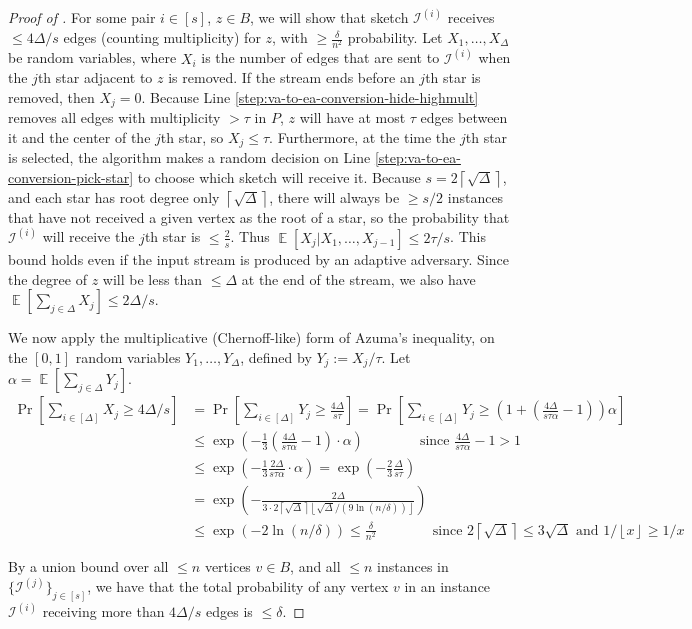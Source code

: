 \documentclass[10pt]{article}
\theoremstyle{definition}\newtheorem{definition}[lemma]{Definition}
\theoremstyle{remark}  \newtheorem*{remark}{Remark}
\DeclareMathOperator{\EE}{\mathbb{E}}
\newcommand{\cI}{\mathcal{I}}
\newcommand{\ceil}[1]{{\left\lceil{#1}\right\rceil}}
\newcommand{\floor}[1]{{\left\lfloor{#1}\right\rfloor}}
\begin{document}
\begin{proof}[Proof of ]
  For some pair $i \in [s]$, $z \in B$, we will show that sketch $\cI^{(i)}$ receives $\le 4 \Delta / s$ edges (counting multiplicity) for $z$, with $\ge \frac{\delta}{n^2}$ probability. Let $X_1,\ldots,X_\Delta$ be random variables, where $X_i$ is the number of edges that are sent to $\cI^{(i)}$ when the $j$th star adjacent to $z$ is removed. If the stream ends before an $j$th star is removed, then $X_j = 0$. Because Line \ref{step:va-to-ea-conversion-hide-highmult} removes all edges with multiplicity $> \tau$ in $P$, $z$ will have at most $\tau$ edges between it and the center of the $j$th star, so $X_j \le \tau$. Furthermore, at the time the $j$th star is selected, the algorithm makes a random decision on Line \ref{step:va-to-ea-conversion-pick-star} to choose which sketch will receive it. Because $s = 2\ceil{\sqrt{\Delta}}$, and each star has root degree only $\ceil{\sqrt{\Delta}}$, there will always be $\ge s/2$ instances that have not received a given vertex as the root of a star, so the probability that $\cI^{(i)}$ will receive the $j$th star is $\le \frac{2}{s}$. Thus $\EE[X_j | X_1,\ldots,X_{j-1}] \le 2 \tau / s$. This bound holds even if the input stream is produced by an adaptive adversary. Since the degree of $z$ will be less than $\le \Delta$ at the end of the stream, we also have $\EE[\sum_{j \in \Delta} X_j] \le 2 \Delta / s$.
  
  We now apply the multiplicative (Chernoff-like) form of Azuma's inequality, on the $[0,1]$ random variables $Y_1,\ldots,Y_\Delta$, defined by $Y_j := X_j / \tau$. Let $\alpha = \EE[\sum_{j \in \Delta} Y_j]$.
  \begin{align*}
    \Pr\left[\sum_{i \in [\Delta]} X_j \ge 4 \Delta / s\right] &= \Pr\left[ \sum_{i \in [\Delta]} Y_j \ge \frac{4 \Delta}{s \tau} \right] = \Pr\left[ \sum_{i \in [\Delta]} Y_j \ge \left(1 + \left(\frac{4 \Delta}{s \tau \alpha} - 1\right)\right) \alpha \right] \\
      &\le \exp\left( - \frac{1}{3} \left(\frac{4 \Delta}{s \tau \alpha} - 1\right) \cdot \alpha \right) \qquad\qquad \text{since $\frac{4 \Delta}{s \tau \alpha} - 1 > 1$} \\
      &\le \exp\left( - \frac{1}{3} \frac{2 \Delta}{s \tau \alpha}\cdot \alpha \right) =  \exp\left( - \frac{2}{3} \frac{\Delta}{s \tau} \right) \\
      &= \exp\left( - \frac{2 \Delta}{3 \cdot 2 \ceil{\sqrt{\Delta}} \floor{\sqrt{\Delta} / (9 \ln(n/\delta))}} \right) \\
      &\le \exp\left( - 2 \ln(n/\delta)\right) \le \frac{\delta}{n^2} \qquad\qquad \text{since $2 \ceil{\sqrt{\Delta}} \le 3 \sqrt{\Delta}$ and $1/\floor{x} \ge 1/x$}
  \end{align*}

  By a union bound over all $\le n$ vertices $v \in B$, and all $\le n$ instances in $\{\cI^{(j)}\}_{j\in [s]}$, we have that the total probability of any vertex $v$ in an instance $\cI^{(i)}$ receiving more than $4 \Delta / s$ edges is $\le \delta$.
\end{proof}
\end{document}
